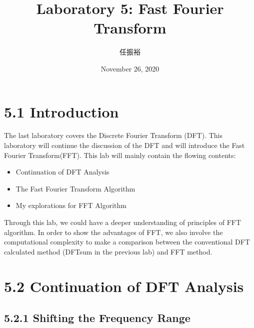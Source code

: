 \documentclass[onecolumn,oneside]{SUSTechHomework}
\begin{document}
\author{任振裕}
\title{Laboratory 5: Fast Fourier Transform}
\date{November 26, 2020}
\maketitle

\section*{5.1 Introduction}
The last laboratory covers the Discrete Fourier Transform (DFT). This laboratory will continue the
discussion of the DFT and will introduce the Fast Fourier Transform(FFT). This lab will mainly contain
the flowing contents:
\begin{itemize}
    \item Continuation of DFT Analysis
    \item The Fast Fourier Transform Algorithm
    \item My explorations for FFT Algorithm
\end{itemize}
Through this lab, we could have a deeper understanding of principles of FFT algorithm. In 
order to show the advantages of FFT, we also involve the computational complexity to make 
a comparison between the conventional DFT calculated method (DFTsum in the previous lab) and FFT
method. 

\section*{5.2 Continuation of DFT Analysis}
\subsection*{5.2.1 Shifting the Frequency Range}
\end{document}

